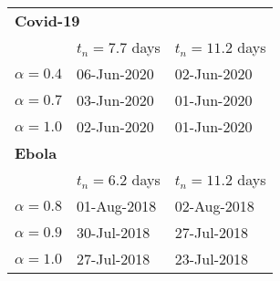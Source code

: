 \begin{tabular}{lll} 
\hline
\multicolumn{3}{l}{ \bf Covid-19} \\ 
 &  $t_n=7.7$ days & $t_n=11.2$ days \\ 
$\alpha=0.4$ & 06-Jun-2020 & 02-Jun-2020 \\ 
 $\alpha=0.7$ & 03-Jun-2020 & 01-Jun-2020 \\ 
 $\alpha=1.0$ & 02-Jun-2020 & 01-Jun-2020 \\ 
 \hline
\multicolumn{3}{l}{ \bf Ebola} \\ 
 &  $t_n=6.2$ days & $t_n=11.2$ days \\ 
$\alpha=0.8$ & 01-Aug-2018 & 02-Aug-2018 \\ 
 $\alpha=0.9$ & 30-Jul-2018 & 27-Jul-2018 \\ 
 $\alpha=1.0$ & 27-Jul-2018 & 23-Jul-2018 \\ 
 \hline
\end{tabular} 
